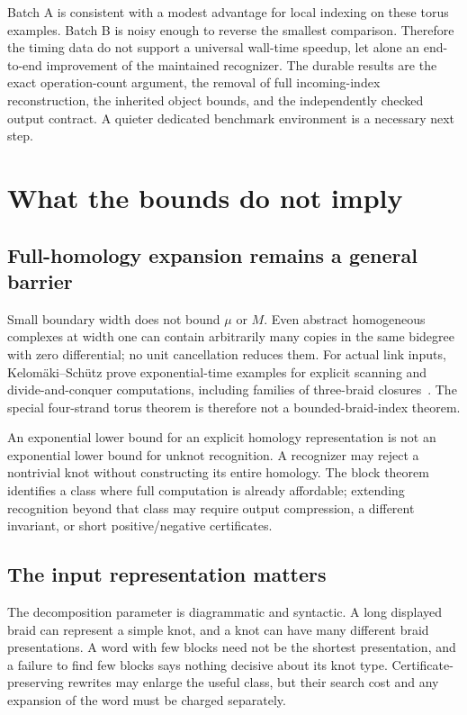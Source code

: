 \documentclass[11pt,letterpaper]{article}
\theoremstyle{remark}\newtheorem{remark}[theorem]{Remark}
\begin{document}
Batch A is consistent with a modest advantage for local indexing on these torus examples. Batch B is noisy enough to reverse the smallest comparison. Therefore the timing data do not support a universal wall-time speedup, let alone an end-to-end improvement of the maintained recognizer. The durable results are the exact operation-count argument, the removal of full incoming-index reconstruction, the inherited object bounds, and the independently checked output contract. A quieter dedicated benchmark environment is a necessary next step.

\section{What the bounds do not imply}
\subsection{Full-homology expansion remains a general barrier}
Small boundary width does not bound $\mu$ or $M$. Even abstract homogeneous complexes at width one can contain arbitrarily many copies in the same bidegree with zero differential; no unit cancellation reduces them. For actual link inputs, Kelom\"aki--Sch\"utz prove exponential-time examples for explicit scanning and divide-and-conquer computations, including families of three-braid closures~\cite{KS26}. The special four-strand torus theorem is therefore not a bounded-braid-index theorem.

An exponential lower bound for an explicit homology representation is not an exponential lower bound for unknot recognition. A recognizer may reject a nontrivial knot without constructing its entire homology. The block theorem identifies a class where full computation is already affordable; extending recognition beyond that class may require output compression, a different invariant, or short positive/negative certificates.

\subsection{The input representation matters}
The decomposition parameter is diagrammatic and syntactic. A long displayed braid can represent a simple knot, and a knot can have many different braid presentations. A word with few blocks need not be the shortest presentation, and a failure to find few blocks says nothing decisive about its knot type. Certificate-preserving rewrites may enlarge the useful class, but their search cost and any expansion of the word must be charged separately.
\end{document}

